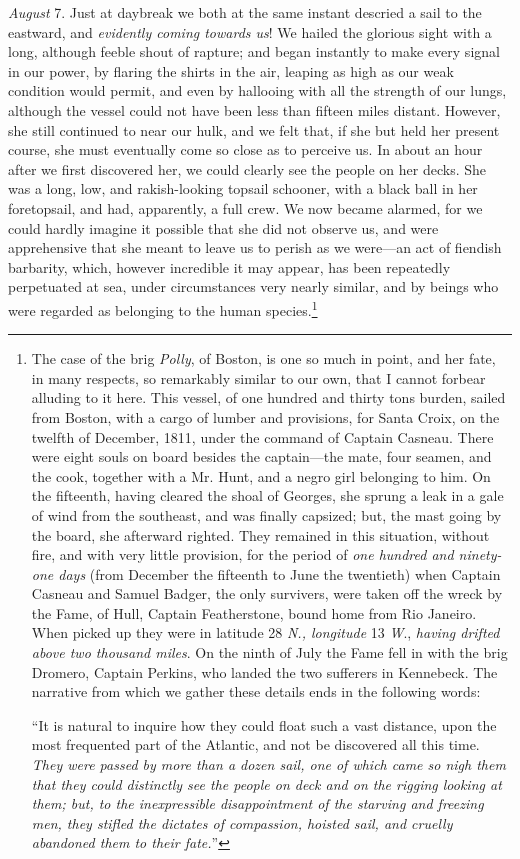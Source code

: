 \emph{August} 7. Just at daybreak we both at the same instant descried a sail
to the eastward, and \emph{evidently coming towards us}! We hailed the glorious
sight with a long, although feeble shout of rapture; and began instantly to make
every signal in our power, by flaring the shirts in the air, leaping as high as
our weak condition would permit, and even by hallooing with all the strength of
our lungs, although the vessel could not have been less than fifteen miles
distant. However, she still continued to near our hulk, and we felt that, if she
but held her present course, she must eventually come so close as to perceive
us. In about an hour after we first discovered her, we could clearly see the
people on her decks. She was a long, low, and rakish-looking topsail schooner,
with a black ball in her foretopsail, and had, apparently, a full crew. We now
became alarmed, for we could hardly imagine it possible that she did not observe
us, and were apprehensive that she meant to leave us to perish as we were---an
act of fiendish barbarity, which, however incredible it may appear, has been
repeatedly perpetuated at sea, under circumstances very nearly similar, and by
beings who were regarded as belonging to the human species.\footnote{
The case of the
brig \emph{Polly}, of Boston, is one so much in point, and her fate, in many
respects, so remarkably similar to our own, that I cannot forbear alluding to it
here. This vessel, of one hundred and thirty tons burden, sailed from Boston,
with a cargo of lumber and provisions, for Santa Croix, on the twelfth of
December, 1811, under the command of Captain Casneau. There were eight souls on
board besides the captain---the mate, four seamen, and the cook, together with a
Mr. Hunt, and a negro girl belonging to him. On the fifteenth, having cleared
the shoal of Georges, she sprung a leak in a gale of wind from the southeast,
and was finally capsized; but, the mast going by the board, she afterward
righted. They remained in this situation, without fire, and with very little
provision, for the period of \emph{one hundred and ninety-one days} (from
December the fifteenth to June the twentieth) when Captain Casneau and Samuel
Badger, the only survivers, were taken off the wreck by the Fame, of Hull,
Captain Featherstone, bound home from Rio Janeiro. When picked up they were in
latitude 28 \emph{N., longitude} 13 \emph{W}., \emph{having drifted above two
thousand miles}. On the ninth of July the Fame fell in with the brig Dromero,
Captain Perkins, who landed the two sufferers in Kennebeck. The narrative from
which we gather these details ends in the following words: 

``It is natural to inquire how they could float such a vast distance, upon the
most frequented part of the Atlantic, and not be discovered all this time.
\emph{They were passed by more than a dozen sail, one of which came so nigh them
that they could distinctly see the people on deck and on the rigging looking at
them; but, to the inexpressible disappointment of the starving and freezing men,
they stifled the dictates of compassion, hoisted sail, and cruelly abandoned
them to their fate.}''}
